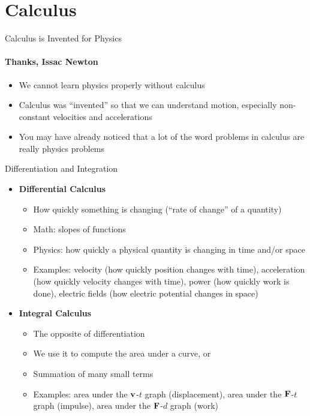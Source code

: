 \documentclass[12pt,compress,aspectratio=169]{beamer}
\newcommand{\mb}[1]{\ensuremath\mathbf{#1}}
\begin{document}
\section{Calculus}

\begin{frame}{Calculus is Invented for Physics}
  \framesubtitle{Thanks, Issac Newton}
  \begin{itemize}
  \item We cannot learn physics properly without calculus %
  \item Calculus was ``invented'' so that we can understand motion, especially
    non-constant velocities and accelerations
  \item You may have already noticed that a lot of the word problems in
    calculus are really physics problems
  \end{itemize}
\end{frame}


\begin{frame}{Differentiation and Integration}
  \begin{itemize}
  \item\textbf{Differential Calculus}
    \begin{itemize}
    \item How quickly something is changing (``rate of change'' of a quantity)
    \item Math: slopes of functions
    \item Physics: how quickly a physical quantity is changing in time and/or
      space
    \item Examples: velocity (how quickly position changes with time),
      acceleration (how quickly velocity changes with time), power (how quickly
      work is done), electric fields (how electric potential changes in space)
    \end{itemize}
  \item\textbf{Integral Calculus}
    \begin{itemize}
    \item The opposite of differentiation
    \item We use it to compute the area under a curve, or
    \item Summation of many small terms
    \item Examples: area under the $\mb{v}$-$t$ graph (displacement), area
      under the $\mb{F}$-$t$ graph (impulse), area under the $\mb{F}$-$d$ graph
      (work)
    \end{itemize}
  \end{itemize}
\end{frame}
\end{document}
